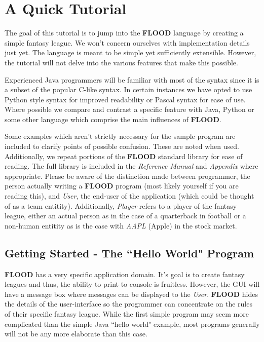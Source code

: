 \documentclass[12pt]{report}
\begin{document}
\chapter{A Quick Tutorial}

The goal of this tutorial is to jump into the \textbf{FLOOD} language by creating a simple fantasy league. We won't concern ourselves with implementation details just yet. The language is meant to be simple yet sufficiently extensible. However, the tutorial will not delve into the various features that make this possible. 

Experienced Java programmers will be familiar with most of the syntax since it is a subset of the popular C-like syntax. In certain instances we have opted to use Python style syntax for improved readability or Pascal syntax for ease of use. Where possible we compare and contrast a specific feature with Java, Python or some other language which comprise the main influences of \textbf{FLOOD}. 

Some examples which aren't strictly necessary for the sample program are included to clarify points of possible confusion. These are noted when used. Additionally, we repeat portions of the \textbf{FLOOD} standard library for ease of reading. The full library is included in the \textit{Reference Manual} and \textit{Appendix} where appropriate. Please be aware of the distinction made between programmer, the person actually writing a \textbf{FLOOD} program (most likely yourself if you are reading this), and \textit{User}, the end-user of the application (which could be thought of as a team entitity). Additionally, \textit{Player} refers to a player of the fantasy league, either an actual person as in the case of a quarterback in football or a non-human entitity as is the case with \textit{AAPL} (Apple) in the stock market.

\section{Getting Started - The ``Hello World" Program}

\textbf{FLOOD} has a very specific application domain. It's goal is to create fantasy leagues and thus, the ability to print to console is fruitless. However, the GUI will have a message box where messages can be displayed to the \textit{User}. \textbf{FLOOD} hides the details of the user-interface so the programmer can concentrate on the rules of their specific fantasy league. While the first simple program may seem more complicated than the simple Java ``hello world" example, most programs generally will not be any more elaborate than this case.
\end{document}
